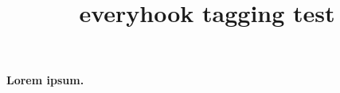 \documentclass{article}
\title{everyhook tagging test}
\begin{document}
\setlength{\parindent}{0pt}
\paragraph{Lorem ipsum.}
\kant[1-4]
\end{document}
